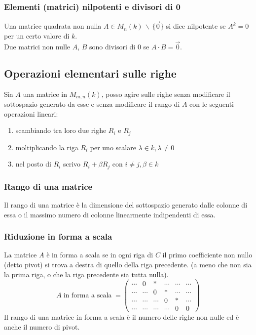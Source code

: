 \documentclass[a4paper]{article}
\begin{document}
\subsubsection*{Elementi (matrici) nilpotenti e divisori di 0}
Una matrice quadrata non nulla \(A \in M_n(k) \, \backslash \, \{ \vec{0} \}\) si dice nilpotente se \(A^k = 0\) per un certo valore di \(k\). \\
Due matrici non nulle \(A\), \(B\) sono divisori di \(0\) se \(A \cdot B = \vec{0}\).

\subsection{Operazioni elementari sulle righe}
Sia \(A\) una matrice in \(M_{m,n}(k)\), posso agire sulle righe senza modificare il sottospazio generato da esse e senza modificare
il rango di \(A\) con le seguenti operazioni lineari:
\begin{enumerate}[topsep=3pt, itemsep=0pt]
	\item scambiando tra loro due righe \(R_i\) e \(R_j\)
	\item moltiplicando la riga \(R_i\) per uno scalare \(\lambda \in k, \lambda \neq 0\)
	\item nel posto di \(R_i\) scrivo \(R_i + \beta R_j\) con \(i \neq j, \beta \in k\)
\end{enumerate}

\subsubsection*{Rango di una matrice}
Il rango di una matrice è la dimensione del sottospazio generato dalle colonne di essa o il massimo numero di colonne linearmente
indipendenti di essa.

\subsubsection*{Riduzione in forma a scala}
La matrice \(A\) è in forma a scala se in ogni riga di \(C\) il primo coefficiente non nullo (detto pivot) si trova a destra di
quello della riga precedente. (a meno che non sia la prima riga, o che la riga precedente sia tutta nulla).
\[A \; \text{in forma a scala} \;  = \begin{pmatrix}
	\cdots & 0 & * & \cdots & \cdots & \cdots \\
	\cdots & \cdots & 0 & * & \cdots & \cdots \\
	\cdots & \cdots & \cdots & 0 & * & \cdots \\
	\cdots & \cdots & \cdots & \cdots & 0 & 0
\end{pmatrix}\]
Il rango di una matrice in forma a scala è il numero delle righe non nulle ed è anche il numero di pivot.
\end{document}
